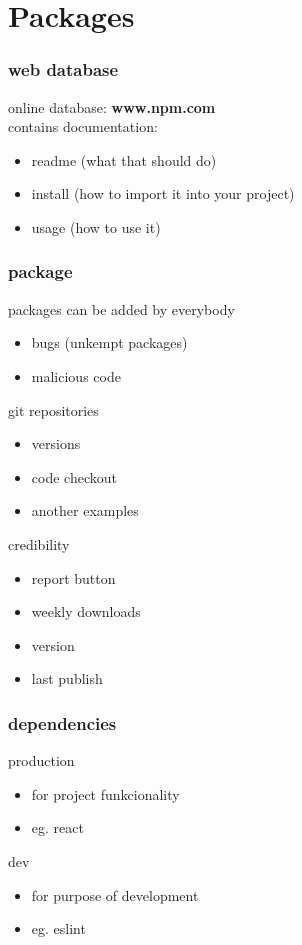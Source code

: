 \documentclass{beamer}
\begin{document}
\section{Packages}

\begin{frame}
\frametitle{web database}
online database:  \textbf{www.npm.com}\\
contains documentation:
\begin{itemize}
\item readme (what that should do)
\item install (how to import it into your project)
\item usage (how to use it)
\end{itemize}
\end{frame}

\begin{frame}
\frametitle{package}
packages can be added by everybody
\begin{itemize}
\item bugs (unkempt packages)
\item malicious code
\end{itemize}
git repositories
\begin{itemize}
\item versions
\item code checkout
\item another examples
\end{itemize}
credibility
\begin{itemize}
\item report button
\item weekly downloads
\item version
\item last publish
\end{itemize}
\end{frame}

\begin{frame}
\frametitle{dependencies}
production
\begin{itemize}
\item for project funkcionality
\item eg. react
\end{itemize}
dev
\begin{itemize}
\item for purpose of development
\item eg. eslint
\end{itemize}
\end{frame}
\end{document}
